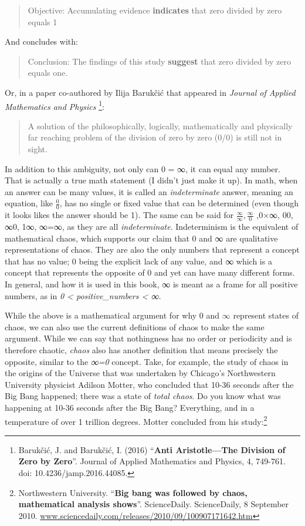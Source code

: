 \documentclass[
]{article}
\begin{document}
\begin{quote}
Objective: Accumulating evidence \textbf{indicates} that zero divided by
zero equals 1
\end{quote}

And concludes with:

\begin{quote}
Conclusion: The findings of this study \textbf{suggest} that zero
divided by zero equals one.
\end{quote}

Or, in a paper co-authored by Ilija Barukčić that appeared in
\emph{Journal of Applied Mathematics and Physics} \footnote{Barukčić, J.
  and Barukčić, I. (2016) ``\textbf{Anti Aristotle---The Division of
  Zero by Zero}''. Journal of Applied Mathematics and Physics, 4,
  749-761. doi: 10.4236/jamp.2016.44085.}:

\begin{quote}
A solution of the philosophically, logically, mathematically and
physically far reaching problem of the division of zero by zero (0/0) is
still not in sight.
\end{quote}

In addition to this ambiguity, not only can 0 = ∞, it can equal any
number. That is actually a true math statement (I didn't just make it
up). In math, when an answer can be many values, it is called an
\emph{indeterminate} answer, meaning an equation, like \(\frac{0}{0}\),
has no single or fixed value that can be determined (even though it
looks likes the answer should be 1). The same can be said for
\(\frac{\infty}{\infty},\frac{\infty}{0}\) ,0×∞, 00, ∞0, 1∞, ∞=∞, as
they are all \emph{indeterminate}. Indeterminism is the equivalent of
mathematical chaos, which supports our claim that 0 and ∞ are
qualitative representations of chaos. They are also the only numbers
that represent a concept that has no value; 0 being the explicit lack of
any value, and ∞ which is a concept that represents the opposite of 0
and yet can have many different forms. In general, and how it is used in
this book, ∞ is meant as a frame for all positive numbers, as in \emph{0
\textless{} positive\_numbers \textless{} ∞.}

While the above is a mathematical argument for why 0 and \(\infty\)
represent states of chaos, we can also use the current definitions of
chaos to make the same argument. While we can say that nothingness has
no order or periodicity and is therefore chaotic, \emph{chaos} also has
another definition that means precisely the opposite, similar to the
\emph{∞=0} concept. Take, for example, the study of chaos in the origins
of the Universe that was undertaken by Chicago's Northwestern University
physicist Adilson Motter, who concluded that 10-36 seconds after the Big
Bang happened; there was a state of \emph{total chaos}. Do you know what
was happening at 10-36 seconds after the Big Bang? Everything, and in a
temperature of over 1 trillion degrees. Motter concluded from his
study:\footnote{Northwestern University. ``\textbf{Big bang was followed
  by chaos, mathematical analysis shows}''. ScienceDaily. ScienceDaily,
  8 September 2010.
  \url{www.sciencedaily.com/releases/2010/09/100907171642.htm}}
\end{document}
